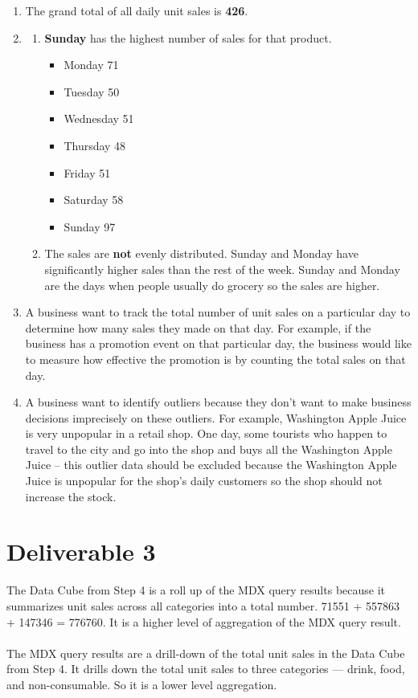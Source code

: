 \documentclass{article}
\begin{document}
\begin{enumerate}
	\item The grand total of all daily unit sales is \textbf{426}.
	\item \begin{enumerate}
			\item \textbf{Sunday} has the highest number of sales for that product.
			\begin{itemize}
				\item Monday 71
				\item Tuesday 50
				\item Wednesday 51
				\item Thursday 48
				\item Friday 51
				\item Saturday 58
				\item Sunday 97
			\end{itemize}
			\item The sales are \textbf{not} evenly distributed. Sunday and Monday have significantly higher sales than the rest of the week. Sunday and Monday are the days when people usually do grocery so the sales are higher.
		\end{enumerate}
	\item A business want to track the total number of unit sales on a particular day to determine how many sales they made on that day. For example, if the business has a promotion event on that particular day, the business would like to measure how effective the promotion is by counting the total sales on that day.
	\item A business want to identify outliers because they don't want to make business decisions imprecisely on these outliers. For example, Washington Apple Juice is very unpopular in a retail shop. One day, some tourists who happen to travel to the city and go into the shop and buys all the Washington Apple Juice -- this outlier data should be excluded because the Washington Apple Juice is unpopular for the shop's daily customers so the shop should not increase the stock.
\end{enumerate}

\section{Deliverable 3}

The Data Cube from Step 4 is a roll up of the MDX query results because it summarizes unit sales across all categories into a total number. 71551 + 557863 + 147346 = 776760. It is a higher level of aggregation of the MDX query result.\\
\\
\noindent The MDX query results are a drill-down of the total unit sales in the Data Cube from Step 4. It drills down the total unit sales to three categories --- drink, food, and non-consumable. So it is a lower level aggregation.
\end{document}

